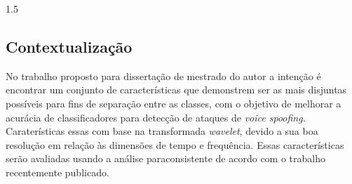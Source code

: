 \documentclass[a4paper,12pt,openright,oneside]{book}
\newenvironment{myenv}[1]
  {\begin{spacing}{#1}}
  {\end{spacing}}
\begin{document}
\begin{myenv}{1.5}
			\subsection{Contextualização}
			\par No trabalho proposto para dissertação de mestrado do autor a intenção é encontrar um conjunto de características que demonstrem ser as mais disjuntas possíveis para fins de separação entre as classes, com o objetivo de melhorar a acurácia de classificadores para detecção de ataques de \textit{voice spoofing}. Caraterísticas essas com base na transformada \textit{wavelet}, devido a sua boa resolução em relação às dimensões de tempo e frequência. Essas características serão avaliadas usando a análise paraconsistente de acordo com o trabalho \cite{8588433} recentemente publicado.

		\end{myenv}
\end{document}
